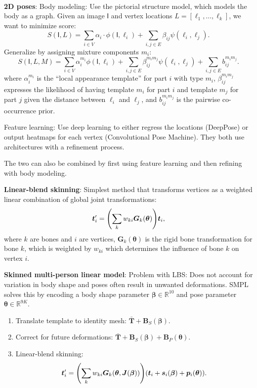 \documentclass{article}
\newcommand{\lft}{\mathopen{}\mathclose\bgroup\left}
\newcommand{\rgt}{\aftergroup\egroup\right}
\newcommand{\R}{\mathbb{R}}
\renewcommand{\vec}[1]{\bm{#1}}
\newcommand{\mat}[1]{\bm{#1}}
\newcommand{\tens}[1]{\bm{\mathsf{#1}}}
\newenvironment{topic}[1]
{\textbf{\sffamily \colorbox{black}{\rlap{\textbf{\textcolor{white}{#1}}}\hspace{\linewidth}\hspace{-2\fboxsep}}} \\ \vspace{0.2cm}}
{}
\begin{document}
\begin{multicols*}{2}
    \begin{topic}{Parametric human body models}
        \textbf{2D poses}: Body modeling: Use the pictorial structure model, which models the body
        as a graph. Given an image $\tens{I}$ and vertex locations $L = [\ell_1, \ldots, \ell_k]$, we want
        to minimize score: \[
            S(\tens{I}, L) = \sum_{i\in V} \alpha_i \cdot \phi(\tens{I}, \ell_i) + \sum_{i,j \in E} \beta_{ij} \psi(\ell_i, \ell_j).
        \]
        Generalize by assigning mixture components $m_i$: \[
            S(\tens{I}, L, M) = \sum_{i\in V} \alpha_i^{m_i} \phi(\tens{I}, \ell_i) + \sum_{i,j \in E} \beta_{ij}^{m_im_j} \psi(\ell_i,\ell_j) + \sum_{i,j \in E} b_{ij}^{m_im_j}.
        \]
        where $\alpha^{m_i}_i$ is the ``local appearance template'' for part $i$ with type $m_i$,
        $\beta^{m_im_j}_{ij}$ expresses the likelihood of having template $m_i$ for part $i$ and template
        $m_j$ for part $j$ given the distance between $\ell_i$ and $\ell_j$, and $b_{ij}^{m_im_j}$ is the
        pairwise co-occurrence prior.

        Feature learning: Use deep learning to either regress the locations (DeepPose) or output heatmaps
        for each vertex (Convolutional Pose Machine). They both use architectures with a refinement
        process.

        The two can also be combined by first using feature learning and then refining with body modeling.

        \textbf{Linear-blend skinning}: Simplest method that transforms vertices as a weighted linear combination of global joint transformations: \[
            \vec{t}_i' = \lft( \sum_{k} w_{ki} \mat{G}_k(\vec{\theta}) \rgt) \vec{t}_i,
        \]
        where $k$ are bones and $i$ are vertices, $\mat{G}_k(\vec{\theta})$ is the rigid bone
        transformation for bone $k$, which is weighted by $w_{ki}$ which determines the influence of bone
        $k$ on vertex $i$.

        \textbf{Skinned multi-person linear model}: Problem with LBS: Does not account for variation
        in body shape and poses often result in unwanted deformations. SMPL solves this by encoding a
        body shape parameter $\vec{\beta} \in \R^{10}$ and pose parameter $\vec{\theta} \in \R^{9K}$.

        \begin{enumerate}
            \item Translate template to identity mesh: $\bar{\mat{T}} + \mat{B}_S(\vec{\beta})$.
            \item Correct for future deformations: $\bar{\mat{T}} + \mat{B}_S(\vec{\beta}) +
                      \mat{B}_P(\vec{\theta})$.
            \item Linear-blend skinning: \[
                      \vec{t}_i' = \lft( \sum_{k} w_{ki} \mat{G}_k(\vec{\theta}, \mat{J}(\vec{\beta})) \rgt) (\vec{t}_i + \vec{s}_i(\vec{\beta}) + \vec{p}_i(\vec{\theta})).
                  \]
        \end{enumerate}


\end{topic}
\end{multicols*}
\end{document}
